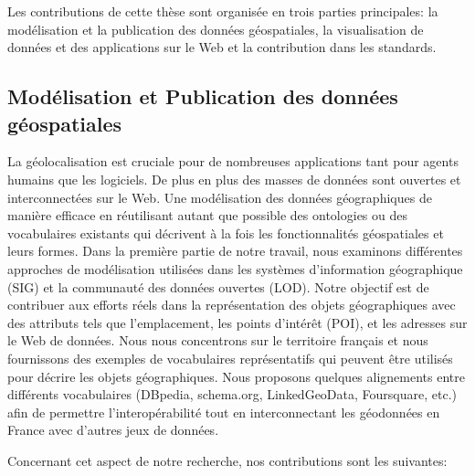 \documentclass[a4paper,11pt,twoside]{report}
\begin{document}
Les contributions de cette thèse sont organisée en trois parties principales: la modélisation et la publication des données géospatiales, la visualisation de données et des applications sur le Web et la contribution dans les standards.

\subsection*{Modélisation et Publication des données géospatiales}

La géolocalisation est cruciale pour de nombreuses applications tant pour agents humains que les logiciels. De plus en plus des masses de données sont ouvertes et interconnectées sur le Web. Une modélisation des données géographiques de manière efficace en réutilisant autant que possible des ontologies ou des vocabulaires existants qui décrivent à la fois les fonctionnalités géospatiales et leurs formes. Dans la première partie de notre travail, nous examinons différentes approches de modélisation utilisées dans les systèmes d'information géographique (SIG) et la communauté des données ouvertes (LOD). Notre objectif est de contribuer aux efforts réels dans la représentation des objets géographiques avec des attributs tels que l'emplacement, les points d'intérêt (POI), et les adresses sur le Web de données. Nous nous concentrons sur le territoire français et nous fournissons des exemples de vocabulaires représentatifs qui peuvent être utilisés pour décrire les objets géographiques. Nous proposons quelques alignements entre différents vocabulaires (DBpedia, schema.org, LinkedGeoData, Foursquare, etc.) afin de permettre l'interopérabilité tout en interconnectant les géodonnées en France avec d'autres jeux de données.
 
Concernant cet aspect de notre recherche, nos contributions sont les suivantes:  
\end{document}
